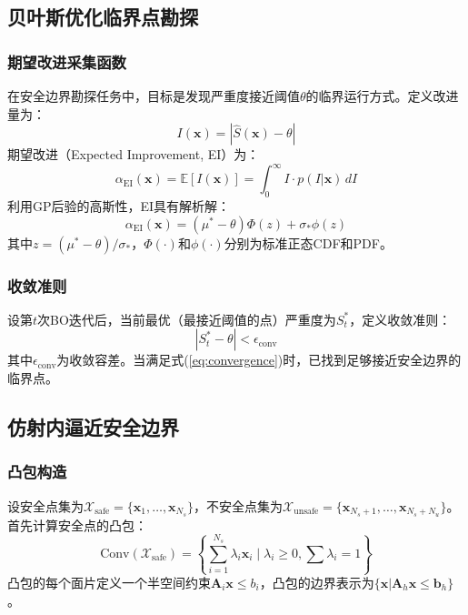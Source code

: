 \documentclass[a4paper,11pt]{ctexart}
\newcommand{\bx}{\mathbf{x}}
\newcommand{\bA}{\mathbf{A}}
\newcommand{\bb}{\mathbf{b}}
\begin{document}
\subsection{贝叶斯优化临界点勘探}
\label{subsec:bo}

\subsubsection{期望改进采集函数}

在安全边界勘探任务中，目标是发现严重度接近阈值$\theta$的临界运行方式。定义改进量为：
\begin{equation}
    I(\bx) = |\hat{S}(\bx) - \theta|
    \label{eq:improvement}
\end{equation}
期望改进（Expected Improvement, EI）为：
\begin{equation}
    \alpha_{\text{EI}}(\bx) = \mathbb{E}[I(\bx)] = \int_0^\infty I \cdot p(I | \bx) \, dI
    \label{eq:ei}
\end{equation}
利用GP后验的高斯性，EI具有解析解：
\begin{equation}
    \alpha_{\text{EI}}(\bx) = (\mu^* - \theta)\Phi(z) + \sigma_* \phi(z)
    \label{eq:ei_analytic}
\end{equation}
其中$z = (\mu^* - \theta)/\sigma_*$，$\Phi(\cdot)$和$\phi(\cdot)$分别为标准正态CDF和PDF。

\subsubsection{收敛准则}

设第$t$次BO迭代后，当前最优（最接近阈值的点）严重度为$S_t^*$，定义收敛准则：
\begin{equation}
    |S_t^* - \theta| < \epsilon_{\text{conv}}
    \label{eq:convergence}
\end{equation}
其中$\epsilon_{\text{conv}}$为收敛容差。当满足式(\ref{eq:convergence})时，已找到足够接近安全边界的临界点。

\subsection{仿射内逼近安全边界}
\label{subsec:aia}

\subsubsection{凸包构造}

设安全点集为$\mathcal{X}_{\text{safe}} = \{\bx_1, \ldots, \bx_{N_s}\}$，不安全点集为$\mathcal{X}_{\text{unsafe}} = \{\bx_{N_s+1}, \ldots, \bx_{N_s+N_u}\}$。首先计算安全点的凸包：
\begin{equation}
    \text{Conv}(\mathcal{X}_{\text{safe}}) = \left\{\sum_{i=1}^{N_s} \lambda_i \bx_i \mid \lambda_i \geq 0, \sum \lambda_i = 1\right\}
    \label{eq:convex_hull}
\end{equation}
凸包的每个面片定义一个半空间约束$\bA_i \bx \leq b_i$，凸包的边界表示为$\{\bx | \bA_h \bx \leq \bb_h\}$。
\end{document}
